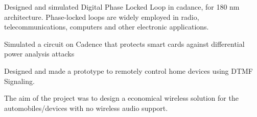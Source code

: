 \documentclass[]{deedy-resume-openfont}
\begin{document}
\begin{minipage}[t]{0.62\textwidth}
\begin{tightemize}
\item  Designed and simulated Digital Phase Locked Loop in cadance, for 180 nm architecture. Phase-locked loops are widely employed in radio, telecommunications, computers and other electronic applications.
\end{tightemize}

\begin{tightemize}
\item  Simulated a circuit on Cadence that protects smart cards against differential power analysis attacks
\end{tightemize}


\begin{tightemize}
\item Designed and made a prototype to remotely control home devices using DTMF Signaling.
\end{tightemize}

\begin{tightemize}
\item The aim of the project was to design a economical wireless solution for the automobiles/devices with no wireless audio support.
\end{tightemize}





\end{minipage}
\end{document}
